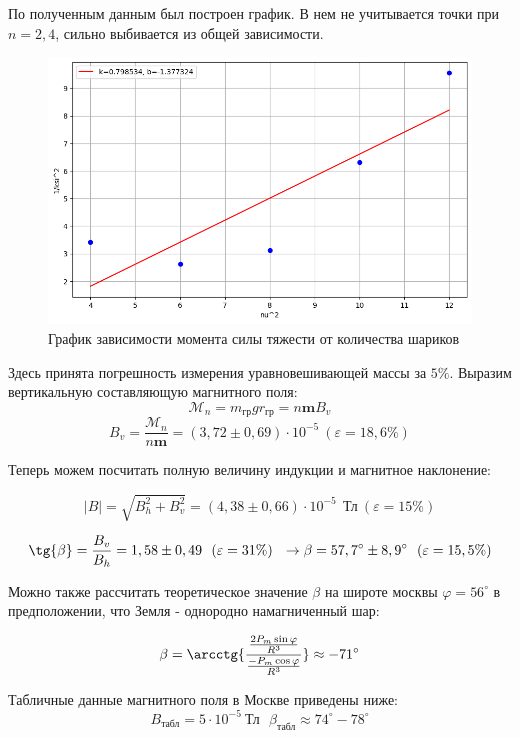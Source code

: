 \documentclass[a4paper, 12pt]{article}
\begin{document}
	По полученным данным был построен график. В нем не учитывается точки при $n = 2, 4$, сильно выбивается из общей зависимости.
	
	\begin{figure}[h!]
		\centering
		\includegraphics[width = \textwidth]{pictures/data2.png}
		\caption{График зависимости момента силы тяжести от количества шариков}
	\end{figure}
	
	Здесь принята погрешность измерения уравновешивающей массы за $5\%$. Выразим вертикальную составляющую магнитного поля:
	\[\mathcal{M}_n = m_{\text{гр}}gr_{\text{гр}} = n\mathbf{m}B_v\]
	\[B_v = \frac{\mathcal{M}_n}{n\mathbf{m}} = (3,72 \pm 0,69) \cdot 10^{-5} \ (\varepsilon = 18,6\%)\]
	
	Теперь можем посчитать полную величину индукции и магнитное наклонение:
	
	\[|B| = \sqrt{B_h^2 + B_v^2} = (4,38 \pm 0,66) \cdot 10^{-5} \ \ \text{Тл} \ (\varepsilon = 15\%) \]
	
	\[\tg{\beta} = \frac{B_v}{B_h} = 1,58 \pm 0,49 \ \ (\varepsilon = 31\%)\ \ \rightarrow \beta = 57,7^{\circ} \pm 8,9^{\circ} \ \ (\varepsilon = 15,5\%)\]
	
		Можно также рассчитать теоретическое значение $\beta$ на широте москвы $\varphi = 56^{\circ}$ в предположении, что Земля - однородно намагниченный шар:
	
	\[\beta = \arcctg{\frac{\frac{2P_m \sin{\varphi}}{R^3}}{\frac{-P_m \cos{\varphi}}{R^3}}} \approx -71^{\circ}\]
	
	Табличные данные магнитного поля в Москве приведены ниже:
	\[B_{\text{табл}} = 5 \cdot 10^{-5} \ \text{Тл} \ \ \ \beta_{\text{табл}} \approx 74^{\circ} - 78^{\circ}\]
	
\end{document}
